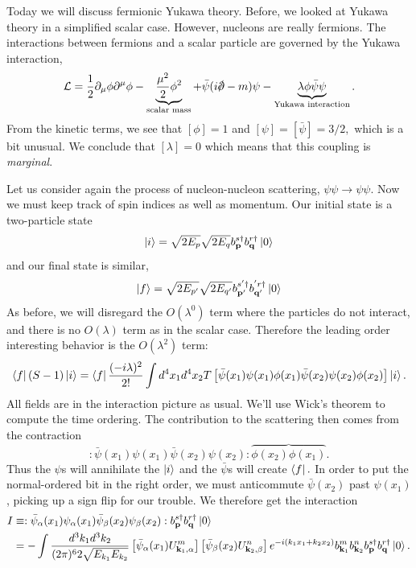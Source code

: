 Today we will discuss fermionic Yukawa theory. Before, we looked at Yukawa theory in a simplified scalar case. However, nucleons are really fermions. The interactions between fermions and a scalar particle are governed by the Yukawa interaction,
$$\cL=\frac{1}{2}\p_\mu \phi \p^\mu \phi -\underbrace{\frac{\mu^2}{2}\phi^2}_{\text{scalar mass}} +\bar \psi (i\slashed{\p}-m)\psi -\underbrace{\lambda \phi \bar \psi \psi}_{\text{Yukawa interaction}}.$$
From the kinetic terms, we see that $[\phi]=1$ and $[\psi]=[\bar \psi]=3/2,$ which is a bit unusual. We conclude that $[\lambda]=0$ which means that this coupling is \emph{marginal}.

Let us consider again the process of nucleon-nucleon scattering, $\psi\psi\to \psi\psi.$ Now we must keep track of spin indices as well as momentum. Our initial state is a two-particle state
$$\left| i \right>=\sqrt{2E_p}\sqrt{2E_q}b_{\boldsymbol{\mathbf{p}}}^{s\dagger}b_{\boldsymbol{\mathbf{q}}}^{r\dagger}\left| 0 \right>$$
and our final state is similar,
$$\left| f \right>=\sqrt{2E_{p'}}\sqrt{2E_{q'}}b_{\boldsymbol{\mathbf{p}}'}^{s'\dagger}b_{\boldsymbol{\mathbf{q}}'}^{'r\dagger}\left| 0 \right>$$
As before, we will disregard the $O(\lambda^0)$ term where the particles do not interact, and there is no $O(\lambda)$ term as in the scalar case. Therefore the leading order interesting behavior is the $O(\lambda^2)$ term:
\begin{equation}
    \left< f \right|(S-1)\left| i \right>=\left< f \right|\frac{(-i\lambda)^2}{2!}\int d^4 x_1 d^4 x_2 T\left[\bar \psi(x_1)\psi(x_1)\phi(x_1)\bar \psi(x_2)\psi(x_2)\phi(x_2)\right]\left| i \right>.
\end{equation}
All fields are in the interaction picture as usual. We'll use Wick's theorem to compute the time ordering. The contribution to the scattering then comes from the contraction
$$:\bar \psi(x_1)\psi(x_1)\bar \psi(x_2)\psi(x_2):\overbrace{\phi(x_2)\phi(x_1)}.$$
Thus the $\psi$s will annihilate the $\left| i \right>$ and the $\bar \psi$s will create $\left< f \right|.$ In order to put the normal-ordered bit in the right order, we must anticommute $\bar \psi(x_2)$ past $\psi(x_1)$, picking up a sign flip for our trouble. We therefore get the interaction
\begin{align*}
    I&\equiv :\bar \psi_\alpha(x_1)\psi_\alpha(x_1)\bar \psi_\beta(x_2)\psi_\beta(x_2): b_{\boldsymbol{\mathbf{p}}}^{s\dagger} b_{\boldsymbol{\mathbf{q}}}^{r\dagger}\left| 0 \right>\\
    &=- \int \frac{d^3k_1 d^3k_2}{(2\pi)^6 2\sqrt{E_{k_1} E_{k_2}}} \left[\bar \psi_\alpha(x_1) U_{\boldsymbol{\mathbf{k}}_1,\alpha}^m\right] \left[\bar\psi_\beta (x_2) U_{\boldsymbol{\mathbf{k}}_2,\beta}^n\right] e^{-i(k_1x_1+k_2x_2)}b_{\boldsymbol{\mathbf{k}}_1}^m b_{\boldsymbol{\mathbf{k}}_2}^n b_{\boldsymbol{\mathbf{p}}}^{s\dagger} b_{\boldsymbol{\mathbf{q}}}^{r\dagger}\left| 0 \right>.
\end{align*}
